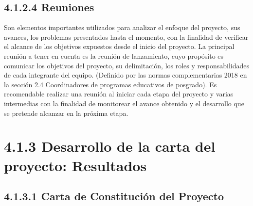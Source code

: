 \documentclass[letterpaper,12pt,openright,oneside]{article}
\theoremstyle{plain}
\begin{document}
% 
% 
\subsection*{4.1.2.4 Reuniones}

Son elementos importantes utilizados para analizar el enfoque del proyecto, sus avances, los problemas presentados hasta el momento, con la finalidad de verificar el alcance de los objetivos expuestos desde el inicio del proyecto.
La principal reunión a tener en cuenta es la reunión de lanzamiento, cuyo propósito es comunicar los objetivos del proyecto, su delimitación, los roles y responsabilidades de cada integrante del equipo.
(Definido por las normas complementarias 2018 en la sección 2.4 Coordinadores de programas educativos de posgrado).
Es recomendable realizar una reunión al iniciar cada etapa del proyecto y varias intermedias con la finalidad de monitorear el avance obtenido y el desarrollo que se pretende alcanzar en la próxima etapa.

% 
%
\section*{4.1.3 Desarrollo de la carta del proyecto: Resultados}

% 
%
\subsection*{4.1.3.1 Carta de Constitución del Proyecto}
\end{document}
